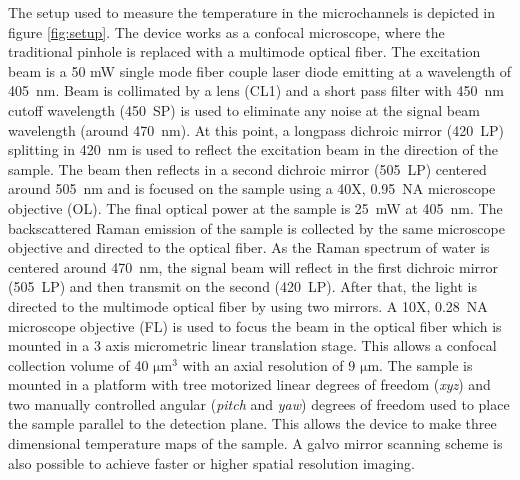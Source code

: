 \documentclass[twocolumn]{svjour3}       %
\begin{document}
The setup used to measure the temperature in the microchannels is depicted in figure \ref{fig:setup}. The device works as a confocal microscope, where the traditional pinhole is replaced with a multimode optical fiber. The excitation beam is a 50 mW single mode fiber couple laser diode emitting at a wavelength of 405~nm. Beam is collimated by a lens (CL1) and a short pass filter with 450~nm cutoff wavelength (450~SP) is used to eliminate any noise at the signal beam wavelength (around 470~nm).
At this point, a longpass dichroic mirror (420~LP) splitting in 420~nm is used to reflect the excitation beam in the direction of the sample. The beam then reflects in a second dichroic mirror (505~LP) centered around 505~nm and is focused on the sample using a 40X, 0.95~NA microscope objective (OL). The final optical power at the sample is 25~mW at 405~nm. The backscattered Raman emission of the sample is collected by the same microscope objective and directed to the optical fiber. As the Raman spectrum of water is centered around 470~nm, the signal beam will reflect in the first dichroic mirror (505~LP) and then transmit on the second (420~LP). After that, the light is directed to the multimode optical fiber by using two mirrors. A 10X, 0.28~NA microscope objective (FL) is used to focus the beam in the optical fiber which is mounted in a 3 axis micrometric linear translation stage. This allows a confocal collection volume of 40 $\mathrm{\mu m^3}$ with an axial resolution of 9 $\mathrm{\mu m}$. The sample is mounted in a platform with tree motorized linear degrees of freedom (\textit{xyz}) and two manually controlled angular (\textit{pitch} and \textit{yaw}) degrees of freedom used to place the sample parallel to the detection plane. This allows the device to make three dimensional temperature maps of the sample. A galvo mirror scanning scheme is also possible to achieve faster or higher spatial resolution imaging.
\end{document}
